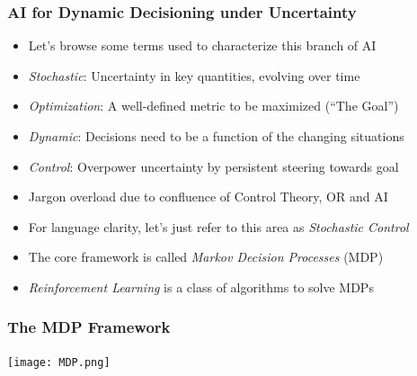 \documentclass[handout]{beamer}
\begin{document}
\begin{frame}
\frametitle{AI for Dynamic Decisioning under Uncertainty}
\pause
\begin{itemize}[<+->]
\item Let's browse some terms used to characterize this branch of AI
\item {\em Stochastic}: Uncertainty in key quantities, evolving over time
\item {\em Optimization}: A well-defined metric to be maximized (``The Goal'')
\item {\em Dynamic}:  Decisions need to be a function of the changing situations
\item {\em Control}: Overpower uncertainty by persistent steering towards goal
\item Jargon overload due to confluence of Control Theory, OR and AI
\item For language clarity, let's just refer to this area as {\em Stochastic Control}
\item The core framework is called {\em Markov Decision Processes} (MDP)
\item {\em Reinforcement Learning} is a class of algorithms to solve MDPs
\end{itemize}
\end{frame}



\begin{frame}
\frametitle{The MDP Framework}
\texttt{[image: MDP.png]}
\end{frame}
\end{document}
